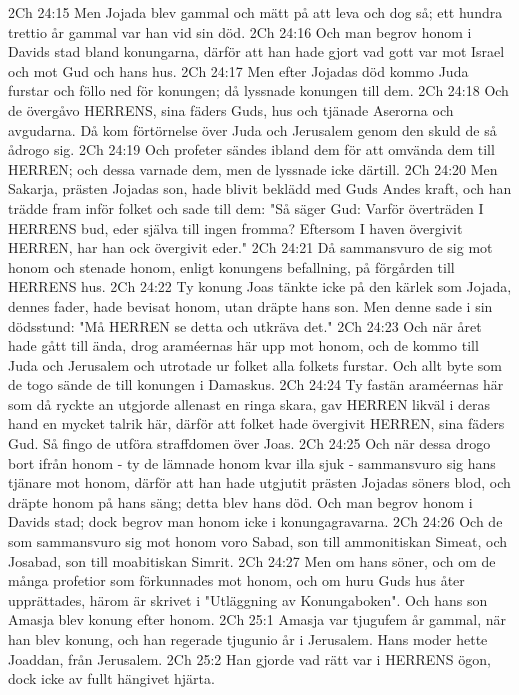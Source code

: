 2Ch 24:15  Men Jojada blev gammal och mätt på att leva och dog så; ett hundra trettio år gammal var han vid sin död.
2Ch 24:16  Och man begrov honom i Davids stad bland konungarna, därför att han hade gjort vad gott var mot Israel och mot Gud och hans hus.
2Ch 24:17  Men efter Jojadas död kommo Juda furstar och föllo ned för konungen; då lyssnade konungen till dem.
2Ch 24:18  Och de övergåvo HERRENS, sina fäders Guds, hus och tjänade Aserorna och avgudarna. Då kom förtörnelse över Juda och Jerusalem genom den skuld de så ådrogo sig.
2Ch 24:19  Och profeter sändes ibland dem för att omvända dem till HERREN; och dessa varnade dem, men de lyssnade icke därtill.
2Ch 24:20  Men Sakarja, prästen Jojadas son, hade blivit beklädd med Guds Andes kraft, och han trädde fram inför folket och sade till dem: "Så säger Gud: Varför överträden I HERRENS bud, eder själva till ingen fromma? Eftersom I haven övergivit HERREN, har han ock övergivit eder."
2Ch 24:21  Då sammansvuro de sig mot honom och stenade honom, enligt konungens befallning, på förgården till HERRENS hus.
2Ch 24:22  Ty konung Joas tänkte icke på den kärlek som Jojada, dennes fader, hade bevisat honom, utan dräpte hans son. Men denne sade i sin dödsstund: "Må HERREN se detta och utkräva det."
2Ch 24:23  Och när året hade gått till ända, drog araméernas här upp mot honom, och de kommo till Juda och Jerusalem och utrotade ur folket alla folkets furstar. Och allt byte som de togo sände de till konungen i Damaskus.
2Ch 24:24  Ty fastän araméernas här som då ryckte an utgjorde allenast en ringa skara, gav HERREN likväl i deras hand en mycket talrik här, därför att folket hade övergivit HERREN, sina fäders Gud. Så fingo de utföra straffdomen över Joas.
2Ch 24:25  Och när dessa drogo bort ifrån honom - ty de lämnade honom kvar illa sjuk - sammansvuro sig hans tjänare mot honom, därför att han hade utgjutit prästen Jojadas söners blod, och dräpte honom på hans säng; detta blev hans död. Och man begrov honom i Davids stad; dock begrov man honom icke i konungagravarna.
2Ch 24:26  Och de som sammansvuro sig mot honom voro Sabad, son till ammonitiskan Simeat, och Josabad, son till moabitiskan Simrit.
2Ch 24:27  Men om hans söner, och om de många profetior som förkunnades mot honom, och om huru Guds hus åter upprättades, härom är skrivet i "Utläggning av Konungaboken". Och hans son Amasja blev konung efter honom.
2Ch 25:1  Amasja var tjugufem år gammal, när han blev konung, och han regerade tjugunio år i Jerusalem. Hans moder hette Joaddan, från Jerusalem.
2Ch 25:2  Han gjorde vad rätt var i HERRENS ögon, dock icke av fullt hängivet hjärta.
